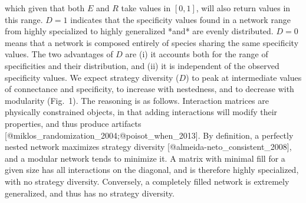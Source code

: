 which given that both $E$ and $R$ take values in $[0,1]$, will also return
values in this range. $D = 1$ indicates that the specificity values found
in a network range from highly specialized to highly generalized *and* are
evenly distributed. $D = 0$ means that a network is composed entirely of
species sharing the same specificity values. The two advantages of $D$ are
(i) it accounts both for the range of specificities and their distribution,
and (ii) it is independent of the observed specificity values. We expect
strategy diversity ($D$) to peak at intermediate values of connectance and
specificity, to increase with nestedness, and to decrease with modularity
(Fig. 1). The reasoning is as follows. Interaction matrices are physically
constrained objects, in that adding interactions will modify their properties,
and thus produce artifacts [@miklos_randomization_2004;@poisot_when_2013]. By
definition, a perfectly nested network maximizes strategy diversity
[@almeida-neto_consistent_2008], and a modular network tends to minimize
it. A matrix with minimal fill for a given size has all interactions
on the diagonal, and is therefore highly specialized, with no strategy
diversity. Conversely, a completely filled network is extremely generalized,
and thus has no strategy diversity.
